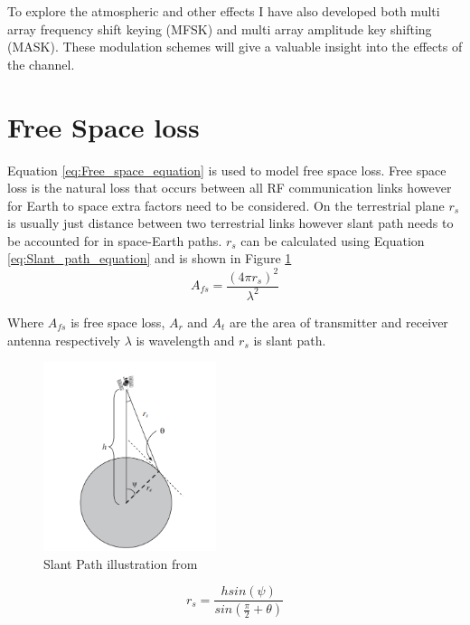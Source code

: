 \documentclass[conference]{IEEEtran}
\begin{document}
To explore the atmospheric and other effects I have also developed both multi array frequency shift keying (MFSK) and multi array amplitude key shifting (MASK). These modulation schemes will give a valuable insight into the effects of the channel. 
\label{sec:Modulation}


\section{Free Space loss}
Equation \ref{eq:Free_space_equation} is used to model free space loss. Free space loss is the natural loss that occurs between all RF communication links \cite{seybold_introduction_2005} however for Earth to space extra factors need to be considered. On the terrestrial plane $r_s$ is usually just distance between two terrestrial links however slant path needs to be accounted for in space-Earth paths. $r_s$ can be calculated using Equation \ref{eq:Slant_path_equation} and is shown in Figure \ref{fig:Slant_path_illustration}\\
\begin{equation}
A_{fs} = \frac{(4 \pi r_s)^2}{\lambda^2 }
\label{eq:Free_space_equation}
\end{equation}

Where $A_{fs}$ is free space loss, $A_r$ and $A_t$ are the area of transmitter and receiver antenna respectively $\lambda$ is wavelength and $r_s$ is slant path.\\
\begin{figure}[h]
\centering
	\includegraphics[width = 0.45\textwidth]{Slant_path.png}
	\caption{Slant Path illustration from \cite{seybold_introduction_2005}}
	\label{fig:Slant_path_illustration}
\end{figure}


\begin{equation}
r_s = \frac{h sin(\psi)}{sin(\frac{\pi}{2}+\theta)}
\label{eq:Slant_path_equation}
\end{equation}
\end{document}
